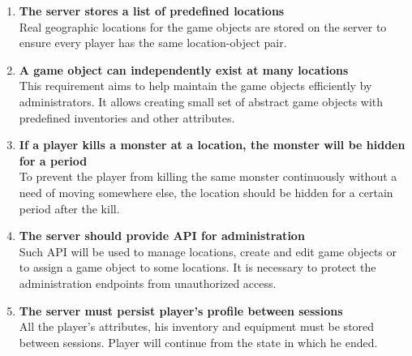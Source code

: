 \begin{enumerate}
			\item \textbf{The server stores a list of predefined locations} \\	
			Real geographic locations for the game objects are stored on the server to ensure every player has the same location-object pair. 
								
			\item \textbf{A game object can independently exist at many locations} \\
			This requirement aims to help maintain the game objects efficiently by administrators. It allows creating small set of abstract game objects with predefined inventories and other attributes. 
			
			\item \textbf{If a player kills a monster at a location, the monster will be hidden for a period} \\
			To prevent the player from killing the same monster continuously without a need of moving somewhere else, the location should be hidden for a certain period after the kill.
			
			\item \textbf{The server should provide API for administration} \\	
			Such API will be used to manage locations, create and edit game objects or to assign a game object to some locations. It is necessary to protect the administration endpoints from unauthorized access.
					
			\item \textbf{The server must persist player’s profile between sessions} \\
			All the player's attributes, his inventory and equipment must be stored between sessions. Player will continue from the state in which he ended.
			
		\end{enumerate}
